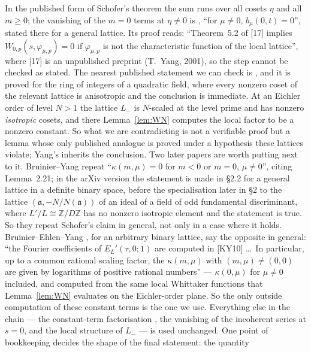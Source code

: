 \documentclass[11pt,reqno]{amsart}
\theoremstyle{plain}
\theoremstyle{definition}
\newcommand{\Z}{\mathbb{Z}}
\newcommand{\Lm}{L_{-}}
\begin{document}
In the published form of Schofer's theorem \cite[Thm.~1.1]{Schofer} the sum runs over all cosets
$\eta$ and all $m\ge0$; the vanishing of the $m=0$ terms at $\eta\neq0$ is
\cite[Lemma~2.21]{Schofer}, ``for $\mu\neq0$, $b_\mu(0,t)=0$'', stated there for a general lattice.
Its proof reads: ``Theorem~5.2 of [17] implies $W_{0,p}(s,\varphi_{\mu,p})=0$ if $\varphi_{\mu,p}$
is not the characteristic function of the local lattice'', where [17] is an unpublished preprint
(T.~Yang, 2001), so the step cannot be checked as stated. The nearest published statement we can
check is \cite[Prop.~5.2]{KY}, and it is proved for the ring of integers of a quadratic field,
where every nonzero coset of the relevant lattice is anisotropic and the conclusion is immediate.
At an Eichler order of level $N>1$ the lattice $\Lm$ is $N$-scaled at the level prime and has
nonzero \emph{isotropic} cosets, and there Lemma~\ref{lem:WN} computes the local factor to be a
nonzero constant. So what we are contradicting is not a verifiable proof but a lemma whose only
published analogue is proved under a hypothesis these lattices violate; Yang's \cite[(11)]{Yang}
inherits the conclusion. Two later papers are worth putting next to it. Bruinier--Yang
\cite[(2.23)]{BY} repeat ``$\kappa(m,\mu)=0$ for $m<0$ or $m=0$, $\mu\neq0$'', citing Lemma~2.21; in
the arXiv version the statement is made in \S2.2 for a general lattice in a definite binary space,
before the specialisation later in \S2 to the lattice $(\mathfrak a,-N/N(\mathfrak a))$ of an ideal of
a field of odd fundamental discriminant, where $L'/L\cong\Z/D\Z$ has no nonzero isotropic element
and the statement is true. So they repeat Schofer's claim in general, not only in a case where it
holds. Bruinier--Ehlen--Yang
\cite[after (3.14)]{BEY}, for an arbitrary binary lattice, say the opposite in general: ``the Fourier
coefficients of $E_L'(\tau,0;1)$ are computed in [KY10] \dots\ In particular, up to a common rational
scaling factor, the $\kappa(m,\mu)$ with $(m,\mu)\neq(0,0)$ are given by logarithms of positive rational
numbers'' --- $\kappa(0,\mu)$ for $\mu\neq0$ included, and computed from the same local Whittaker
functions \cite[Thms.~4.3, 4.4]{KY} that Lemma~\ref{lem:WN} evaluates on the Eichler-order plane. So
the only outside computation of these constant terms is the one we use.
Everything else in the chain --- the constant-term factorisation \cite[Thm.~2.4]{KY}, the vanishing
of the incoherent series at $s=0$, and the local structure of $\Lm$ \cite[Lemma~18]{Yang} --- is
used unchanged. One point of bookkeeping decides the shape of the final statement: the quantity
\end{document}
